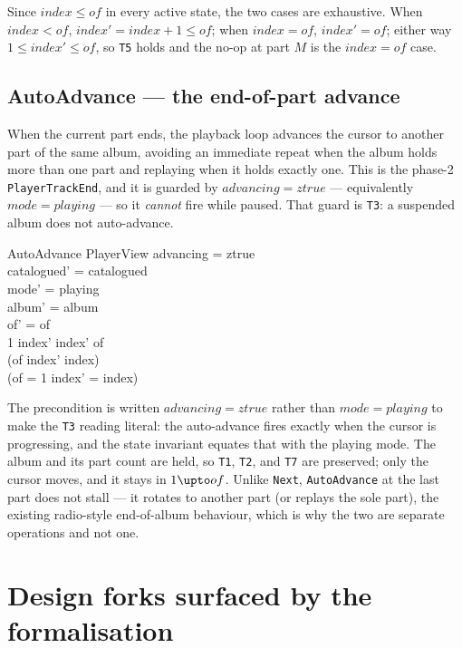 \documentclass[a4paper,10pt,fleqn]{article}
\begin{document}
Since $index \leq of$ in every active state, the two cases are exhaustive. When
$index < of$, $index' = index + 1 \leq of$; when $index = of$, $index' = of$;
either way $1 \leq index' \leq of$, so \texttt{T5} holds and the no-op at part
$M$ is the $index = of$ case.

\subsection{AutoAdvance --- the end-of-part advance}
\label{sec:autoadvance}

When the current part ends, the playback loop advances the cursor to another
part of the same album, avoiding an immediate repeat when the album holds more
than one part and replaying when it holds exactly one. This is the phase-2
\texttt{PlayerTrackEnd}, and it is guarded by $advancing = ztrue$ --- equivalently
$mode = playing$ --- so it \emph{cannot} fire while paused. That guard is
\texttt{T3}: a suspended album does not auto-advance.

\begin{schema}{AutoAdvance}
  \Delta PlayerView
  \where
  advancing = ztrue \\
  catalogued' = catalogued \\
  mode' = playing \\
  album' = album \\
  of' = of \\
  1 \leq index' \land index' \leq of \\
  (of  \implies index' \neq index) \\
  (of = 1 \implies index' = index)
\end{schema}

The precondition is written $advancing = ztrue$ rather than $mode = playing$ to
make the \texttt{T3} reading literal: the auto-advance fires exactly when the
cursor is progressing, and the state invariant equates that with the playing
mode. The album and its part count are held, so \texttt{T1}, \texttt{T2}, and
\texttt{T7} are preserved; only the cursor moves, and it stays in $1 \upto of$.
Unlike \texttt{Next}, \texttt{AutoAdvance} at the last part does not stall --- it
rotates to another part (or replays the sole part), the existing radio-style
end-of-album behaviour, which is why the two are separate operations and not one.

\section{Design forks surfaced by the formalisation}
\label{sec:forks}
\end{document}

